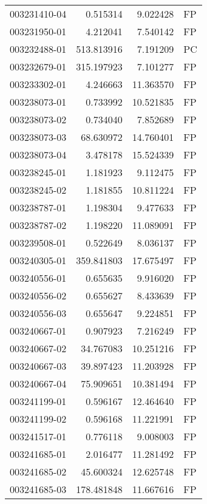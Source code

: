 \begin{tabular}{lrrl}
003231410-04 &    0.515314 &       9.022428 &   FP \\
003231950-01 &    4.212041 &       7.540142 &   FP \\
003232488-01 &  513.813916 &       7.191209 &   PC \\
003232679-01 &  315.197923 &       7.101277 &   FP \\
003233302-01 &    4.246663 &      11.363570 &   FP \\
003238073-01 &    0.733992 &      10.521835 &   FP \\
003238073-02 &    0.734040 &       7.852689 &   FP \\
003238073-03 &   68.630972 &      14.760401 &   FP \\
003238073-04 &    3.478178 &      15.524339 &   FP \\
003238245-01 &    1.181923 &       9.112475 &   FP \\
003238245-02 &    1.181855 &      10.811224 &   FP \\
003238787-01 &    1.198304 &       9.477633 &   FP \\
003238787-02 &    1.198220 &      11.089091 &   FP \\
003239508-01 &    0.522649 &       8.036137 &   FP \\
003240305-01 &  359.841803 &      17.675497 &   FP \\
003240556-01 &    0.655635 &       9.916020 &   FP \\
003240556-02 &    0.655627 &       8.433639 &   FP \\
003240556-03 &    0.655647 &       9.224851 &   FP \\
003240667-01 &    0.907923 &       7.216249 &   FP \\
003240667-02 &   34.767083 &      10.251216 &   FP \\
003240667-03 &   39.897423 &      11.203928 &   FP \\
003240667-04 &   75.909651 &      10.381494 &   FP \\
003241199-01 &    0.596167 &      12.464640 &   FP \\
003241199-02 &    0.596168 &      11.221991 &   FP \\
003241517-01 &    0.776118 &       9.008003 &   FP \\
003241685-01 &    2.016477 &      11.281492 &   FP \\
003241685-02 &   45.600324 &      12.625748 &   FP \\
003241685-03 &  178.481848 &      11.667616 &   FP \\

\end{tabular}
